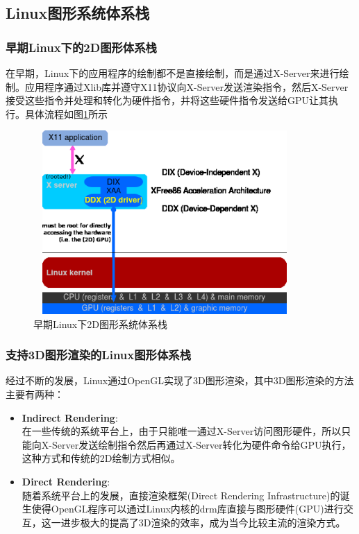 
\subsection{Linux图形系统体系栈}
\subsubsection{早期Linux下的2D图形体系栈}
在早期，Linux下的应用程序的绘制都不是直接绘制，而是通过X-Server来进行绘制。应用程序通过Xlib库并遵守X11协议向X-Server发送渲染指令，然后X-Server接受这些指令并处理和转化为硬件指令，并将这些硬件指令发送给GPU让其执行\cite{Get-X-Off}。具体流程如图\ref{fig:2D-Graph-Stack}所示

\begin{figure}[H] 
  \centering
  \includegraphics[width=10cm,height=7cm]{figures/chap01/Linux_graphics_drivers_2D}
  \caption{早期Linux下2D图形系统体系栈}
  \label{fig:2D-Graph-Stack}
\end{figure}

\subsubsection{支持3D图形渲染的Linux图形体系栈}
经过不断的发展，Linux通过OpenGL实现了3D图形渲染，其中3D图形渲染的方法主要有两种：
\begin{itemize}
\item{\textbf{Indirect Rendering}}: \\
在一些传统的系统平台上，由于只能唯一通过X-Server访问图形硬件，所以只能向X-Server发送绘制指令然后再通过X-Server转化为硬件命令给GPU执行，这种方式和传统的2D绘制方式相似。
\item{\textbf{Direct Rendering}}: \\ 
随着系统平台上的发展，直接渲染框架(Direct Rendering Infrastructure)的诞生使得OpenGL程序可以通过Linux内核的drm库直接与图形硬件(GPU)进行交互，这一进步极大的提高了3D渲染的效率，成为当今比较主流的渲染方式\cite{Fair-Share}。
\end{itemize}

